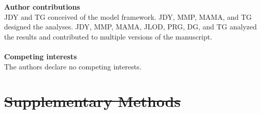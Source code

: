 \documentclass[twocolumn,preprintnumbers,amsmath,amssymb,superscriptaddress,linenumbers]{revtex4-1}
\newcommand{\beginsupplement}{%
        \clearpage
        \setcounter{table}{0}
        \renewcommand{\thetable}{S\arabic{table}}%
        \setcounter{figure}{0}
        \renewcommand{\thefigure}{S\arabic{figure}}%
        \setcounter{equation}{0}
        \renewcommand{\theequation}{S\arabic{equation}}
     }
\providecommand{\DIFdel}[1]{{\protect\color{red}\sout{#1}}}                      %
\providecommand{\DIFdelbegin}{} %
\newcommand{\DIFscaledelfig}{0.5}
\newlength{\DIFdelgraphicswidth} %
\newlength{\DIFdelgraphicsheight} %
\newcommand{\DIFdelincludegraphics}[2][]{%
\sbox{\DIFdelgraphicsbox}{\DIFOincludegraphics[#1]{#2}}%
\settoboxwidth{\DIFdelgraphicswidth}{\DIFdelgraphicsbox} %
\settoboxtotalheight{\DIFdelgraphicsheight}{\DIFdelgraphicsbox} %
\scalebox{\DIFscaledelfig}{%
\parbox[b]{\DIFdelgraphicswidth}{\usebox{\DIFdelgraphicsbox}\\[-\baselineskip] \rule{\DIFdelgraphicswidth}{0em}}\llap{\resizebox{\DIFdelgraphicswidth}{\DIFdelgraphicsheight}{%
\setlength{\unitlength}{\DIFdelgraphicswidth}%
\begin{picture}(1,1)%
\thicklines\linethickness{2pt} %
{\color[rgb]{1,0,0}\put(0,0){\framebox(1,1){}}}%
{\color[rgb]{1,0,0}\put(0,0){\line( 1,1){1}}}%
{\color[rgb]{1,0,0}\put(0,1){\line(1,-1){1}}}%
\end{picture}%
}\hspace*{3pt}}} %
} %
\DeclareRobustCommand{\DIFdelbegin}{\DIFOdelbegin \let\includegraphics\DIFdelincludegraphics} %
\begin{document}
\noindent \textbf{Author contributions}\\
  \footnotesize{
  JDY and TG conceived of the model framework. JDY, MMP, MAMA, and TG designed the analyses. JDY, MMP, MAMA, JLOD, PRG, DG, and TG analyzed the results and contributed to multiple versions of the manuscript.
  }\\ \\
\noindent \textbf{Competing interests}\\
  \footnotesize{
  The authors declare no competing interests.
  }
\clearpage

\clearpage
\DIFdelbegin %



\section*{\DIFdel{Supplementary Methods}}


\end{document}
